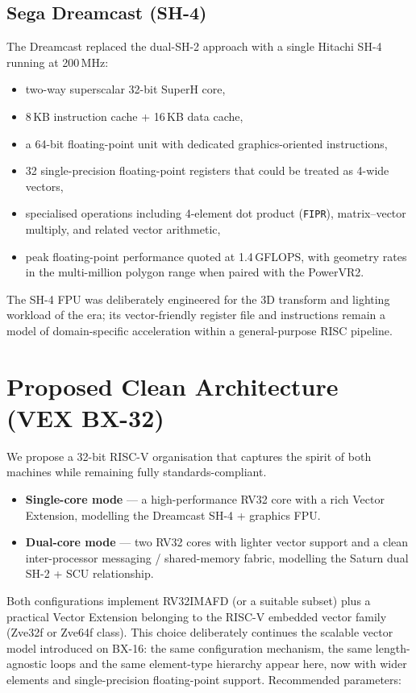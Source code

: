 \documentclass[11pt,a4paper]{article}
\begin{document}
\subsection{Sega Dreamcast (SH-4)}

The Dreamcast replaced the dual-SH-2 approach with a single Hitachi SH-4 running at 200\,MHz:
\begin{itemize}[leftmargin=1.5em]
  \item two-way superscalar 32-bit SuperH core,
  \item 8\,KB instruction cache + 16\,KB data cache,
  \item a 64-bit floating-point unit with dedicated graphics-oriented instructions,
  \item 32 single-precision floating-point registers that could be treated as 4-wide vectors,
  \item specialised operations including 4-element dot product (\texttt{FIPR}), matrix--vector multiply, and related vector arithmetic,
  \item peak floating-point performance quoted at 1.4\,GFLOPS, with geometry rates in the multi-million polygon range when paired with the PowerVR2.
\end{itemize}
The SH-4 FPU was deliberately engineered for the 3D transform and lighting workload of the era; its vector-friendly register file and instructions remain a model of domain-specific acceleration within a general-purpose RISC pipeline.

\section{Proposed Clean Architecture (VEX BX-32)}

We propose a 32-bit RISC-V organisation that captures the spirit of both machines while remaining fully standards-compliant.

\begin{itemize}[leftmargin=1.5em]
  \item \textbf{Single-core mode} --- a high-performance RV32 core with a rich Vector Extension, modelling the Dreamcast SH-4 + graphics FPU.
  \item \textbf{Dual-core mode} --- two RV32 cores with lighter vector support and a clean inter-processor messaging / shared-memory fabric, modelling the Saturn dual SH-2 + SCU relationship.
\end{itemize}

Both configurations implement RV32IMAFD (or a suitable subset) plus a practical Vector Extension belonging to the RISC-V embedded vector family (Zve32f or Zve64f class). This choice deliberately continues the scalable vector model introduced on BX-16: the same configuration mechanism, the same length-agnostic loops and the same element-type hierarchy appear here, now with wider elements and single-precision floating-point support. Recommended parameters:
\end{document}
